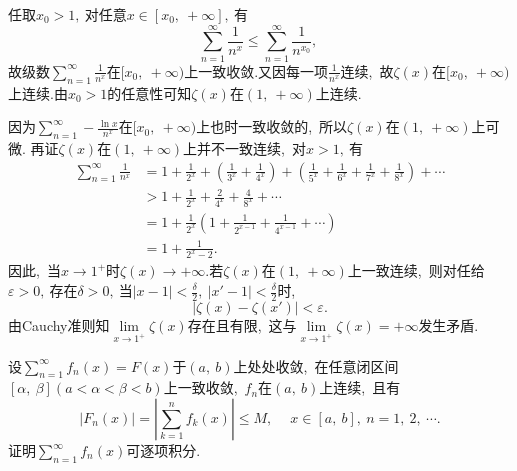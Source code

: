 	\begin{solution}
		任取$x_0>1,\ $对任意$x\in[x_0,\ +\infty],\ $有
		$$\sum\limits_{n=1}^{\infty}\frac{1}{n^x}\le\sum\limits_{n=1}^{\infty}\frac{1}{n^{x_0}},\ $$
		故级数$\sum\limits_{n=1}^{\infty}\frac{1}{n^x}$在$[x_0,\ +\infty)$上一致收敛.又因每一项$\frac{1}{n^x}$连续,\ 故$\zeta(x)$在$[x_0,\ +\infty)$上连续.由$x_0>1$的任意性可知$\zeta(x)$在$\left(1,\ +\infty\right)$上连续.
		
		因为$\sum\limits_{n=1}^{\infty}-\frac{\ln x}{n^x}$在$[x_0,\ +\infty)$上也时一致收敛的,\ 所以$\zeta(x)$在$\left(1,\ +\infty\right)$上可微.
		再证$\zeta(x)$在$\left(1,\ +\infty\right)$上并不一致连续,\ 对$x>1,\ $有
		\begin{align*}
			\sum\limits_{n=1}^{\infty}\frac{1}{n^x}&=1+\frac{1}{2^x}+\left(\frac{1}{3^x}+\frac{1}{4^x}\right)+\left(\frac{1}{5^x}+\frac{1}{6^x}+\frac{1}{7^x}+\frac{1}{8^x}\right)+\cdots\\
			&>1+\frac{1}{2^x}+\frac{2}{4^x}+\frac{4}{8^x}+\cdots\\
			&=1+\frac{1}{2^x}\left(1+\frac{1}{2^{x-1}}+\frac{1}{4^{x-1}}+\cdots\right)\\
			&=1+\frac{1}{2^x-2}.
		\end{align*}
		因此,\ 当$x\rightarrow1^{+}$时$\zeta(x)\rightarrow+\infty.$若$\zeta(x)$在$\left(1,\ +\infty\right)$上一致连续,\ 则对任给$\varepsilon>0,\ $存在$\delta>0,\ $当$|x-1|<\frac{\delta}{2},\ |x'-1|<\frac{\delta}{2}$时,\ 
		$$\left|\zeta(x)-\zeta(x')\right|<\varepsilon.$$
		由Cauchy准则知$\lim\limits_{x\rightarrow1^{+}}\zeta(x)$存在且有限,\ 这与$\lim\limits_{x\rightarrow1^{+}}\zeta(x)=+\infty$发生矛盾. 
	\end{solution}
	\newpage
	\begin{problem}
		设$\sum\limits_{n=1}^{\infty}f_n(x)=F(x)$于$\left(a,\ b\right)$上处处收敛,\ 在任意闭区间$\left[\alpha,\ \beta\right](a<\alpha<\beta<b)$上一致收敛,\ $f_n$在$\left(a,\ b\right)$上连续,\ 且有
		$$\left|F_n(x)\right|=\left|\sum\limits_{k=1}^{n}f_k(x)\right|\le M,\ \quad x\in\left[a,\ b\right],\ n=1,\ 2,\ \cdots.$$
		证明$\sum\limits_{n=1}^{\infty}f_n(x)$可逐项积分.
	\end{problem}
	
